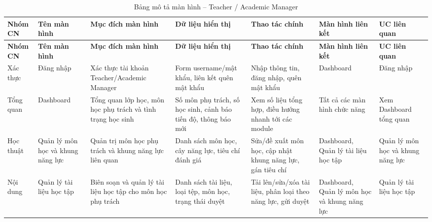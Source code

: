\documentclass[11pt,a4paper]{article}
\begin{document}
	\begin{landscape}
		\footnotesize
		\begin{longtable}{|>{\raggedright\arraybackslash}p{2.1cm}|>{\raggedright\arraybackslash}p{2.3cm}|>{\raggedright\arraybackslash}p{3.4cm}|>{\raggedright\arraybackslash}p{3.6cm}|>{\raggedright\arraybackslash}p{3.6cm}|>{\raggedright\arraybackslash}p{2.6cm}|>{\raggedright\arraybackslash}p{2.6cm}|}
			\caption{Bảng mô tả màn hình – Teacher / Academic Manager}\\
			\hline
			\rowcolor{lightblue}
			\textbf{Nhóm CN} & \textbf{Tên màn hình} & \textbf{Mục đích màn hình} & \textbf{Dữ liệu hiển thị} & \textbf{Thao tác chính} & \textbf{Màn hình liên kết} & \textbf{UC liên quan} \\
			\hline
			\endfirsthead
			\hline
			\rowcolor{lightblue}
			\textbf{Nhóm CN} & \textbf{Tên màn hình} & \textbf{Mục đích màn hình} & \textbf{Dữ liệu hiển thị} & \textbf{Thao tác chính} & \textbf{Màn hình liên kết} & \textbf{UC liên quan} \\
			\hline
			\endhead
			\hline
			\endfoot
			
			Xác thực &
			Đăng nhập &
			Xác thực tài khoản Teacher/Academic Manager &
			Form username/mật khẩu, liên kết quên mật khẩu &
			Nhập thông tin, đăng nhập, quên mật khẩu &
			Dashboard &
			Đăng nhập \\
			\hline
			
			Tổng quan &
			Dashboard &
			Tổng quan lớp học, môn học phụ trách và tình trạng học sinh &
			Số môn phụ trách, số học sinh, cảnh báo tiến độ, thông báo mới &
			Xem số liệu tổng hợp, điều hướng nhanh tới các module &
			Tất cả các màn hình chức năng &
			Xem Dashboard tổng quan \\
			\hline
			
			Học thuật &
			Quản lý môn học và khung năng lực &
			Quản trị môn học phụ trách và khung năng lực liên quan &
			Danh sách môn học, cây năng lực, tiêu chí đánh giá &
			Sửa/đề xuất môn học, cập nhật khung năng lực, gán tiêu chí &
			Dashboard, Quản lý tài liệu học tập &
			Quản lý môn học và khung năng lực \\
			\hline
			
			Nội dung &
			Quản lý tài liệu học tập &
			Biên soạn và quản lý tài liệu học tập cho môn học phụ trách &
			Danh sách tài liệu, loại tệp, môn học, trạng thái duyệt &
			Tải lên/sửa/xóa tài liệu, phân loại theo năng lực, gửi duyệt &
			Dashboard, Quản lý môn học và khung năng lực &
			Quản lý tài liệu học tập \\
			\hline
			

\end{longtable}
\end{landscape}
\end{document}
